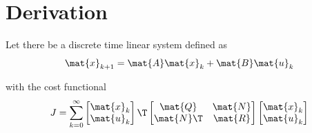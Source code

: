 \section{Derivation}
\label{sec:lqr_derivation}

Let there be a discrete time linear \gls{system} defined as
\begin{equation}
  \mat{x}_{k+1} = \mat{A}\mat{x}_k + \mat{B}\mat{u}_k
\end{equation}

with the cost functional
\begin{equation*}
  J = \sum_{k=0}^\infty
    \begin{bmatrix}
      \mat{x}_k \\
      \mat{u}_k
    \end{bmatrix}\T
    \begin{bmatrix}
      \mat{Q} & \mat{N} \\
      \mat{N}\T & \mat{R}
    \end{bmatrix}
    \begin{bmatrix}
      \mat{x}_k \\
      \mat{u}_k
    \end{bmatrix}
\end{equation*}

